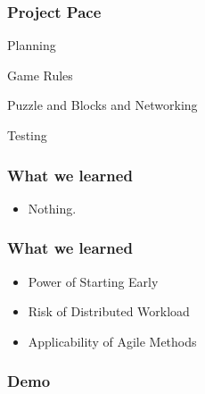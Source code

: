 \documentclass{beamer}
\begin{document}
\begin{frame}
    \frametitle{Project Pace} %
    \pause \item Planning
    \pause \item Game Rules
    \pause \item Puzzle and Blocks and Networking
    \pause \item Testing
\end{frame}

\begin{frame}
  \frametitle{What we learned} %
  \begin{itemize}
	\pause \item Nothing.
  \end{itemize}
\end{frame}

\begin{frame}
  \frametitle{What we learned}
  \begin{itemize}
	\item Power of Starting Early
	\pause \item Risk of Distributed Workload
	\pause \item Applicability of Agile Methods
  \end{itemize}
\end{frame}

\begin{frame}
  \frametitle{Demo} %
\end{frame}
\end{document}

